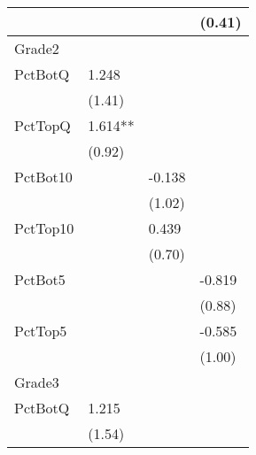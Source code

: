 \begin{table}[htb]
\begin{threeparttable}
\begin{tabular}{l l l l}
               &                               &                               & (0.41)                       \\
      \hline
      Grade2   &                               &                               &                              \\
      PctBotQ  & 1.248                         &                               &                              \\
               & (1.41)                        &                               &                              \\
      PctTopQ  & 1.614**                       &                               &                              \\
               & (0.92)                        &                               &                              \\
      PctBot10 &                               & -0.138                        &                              \\
               &                               & (1.02)                        &                              \\
      PctTop10 &                               & 0.439                         &                              \\
               &                               & (0.70)                        &                              \\
      PctBot5  &                               &                               & -0.819                       \\
               &                               &                               & (0.88)                       \\
      PctTop5  &                               &                               & -0.585                       \\
               &                               &                               & (1.00)                       \\
      \hline
      Grade3   &                               &                               &                              \\
      PctBotQ  & 1.215                         &                               &                              \\
               & (1.54)                        &                               &                              \\

\end{tabular}
\end{threeparttable}
\end{table}
